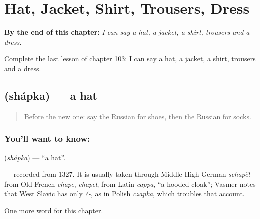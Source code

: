 
\chapter{Hat, Jacket, Shirt, Trousers, Dress}
\label{ch:ru-hat-jacket-shirt-trousers-dress}

\begin{chapteropening}
\textbf{By the end of this chapter:} \emph{I can say a hat, a jacket, a shirt, trousers and a dress.}

Complete the last lesson of chapter 103: I can say a hat, a jacket, a shirt, trousers and a dress.
\end{chapteropening}

\section[\texorpdfstring{\ru{шапка} (shápka)}{шапка (shápka)}]{ (shápka) — a hat}

\label{lesson:RU-C103-hat}



\begin{quote}
Before the new one: say the Russian for shoes, then the Russian for socks.
\end{quote}

\subsection*{You'll want to know: }
\textbf{} (\emph{shápka}) — \textquotedblleft{}a hat\textquotedblright{}.

\begin{cousinweb}
\textbf{} — recorded from 1327. It is usually taken through Middle High German \emph{schapël} from Old French \emph{chape}, \emph{chapel}, from Latin \emph{cappa}, \textquotedblleft{}a hooded cloak\textquotedblright{}; Vasmer notes that West Slavic has only \emph{č-}, as in Polish \emph{czapka}, which troubles that account.
\end{cousinweb}

\begin{grammarlens}[title={What you've built}]
One more word for this chapter.
\end{grammarlens}


